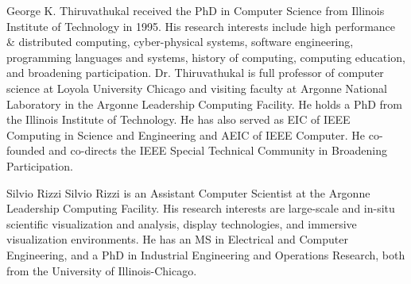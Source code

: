 \documentclass[10pt,journal,compsoc]{IEEEtran}
\begin{document}
\begin{IEEEbiography}{George K. Thiruvathukal}
received the PhD in Computer Science from Illinois Institute of Technology in 1995. His research interests include high performance & distributed computing, cyber-physical systems, software engineering, programming languages and systems, history of computing, computing education, and broadening participation. Dr. Thiruvathukal is full professor of computer science at Loyola University Chicago and visiting faculty at Argonne National Laboratory in the Argonne Leadership Computing Facility. He holds a PhD from the Illinois Institute of Technology. He has also served as EIC of IEEE Computing in Science and Engineering and AEIC of IEEE Computer. He co-founded and co-directs the IEEE Special Technical Community in Broadening Participation.
\end{IEEEbiography}


\begin{IEEEbiography}{Silvio Rizzi}
Silvio Rizzi is an Assistant Computer Scientist at the Argonne Leadership Computing Facility. His research interests are large-scale and in-situ scientific visualization and analysis, display technologies, and immersive visualization environments. He has an MS in Electrical and Computer Engineering, and a PhD in Industrial Engineering and Operations Research, both from the University of Illinois-Chicago.
\end{IEEEbiography}
\end{document}
